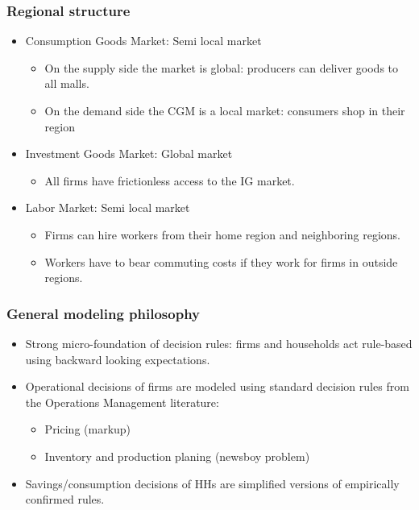 \documentclass{beamer}
\begin{document}
\frame
{
  \frametitle{Regional structure} 
\begin{itemize}
	\item Consumption Goods Market: Semi local market
	
\begin{itemize}
	\item On the supply side the market is global: producers can deliver goods
to all malls.
	\item On the demand side the CGM is a local market: consumers shop in their region
\end{itemize}

\item Investment Goods Market: Global market
\begin{itemize}
	\item  All firms have frictionless access to the IG market.
\end{itemize}
\item Labor Market: Semi local market
\begin{itemize}
	\item Firms can hire workers from their home region and neighboring regions.
	\item Workers have to bear commuting costs if they work for firms in outside regions. 
\end{itemize}


	
\end{itemize}
	

}






\frame
{
  \frametitle{General modeling philosophy} 
\begin{itemize}
\item Strong micro-foundation of decision rules:
 firms and households act rule-based using backward looking expectations. 

\item Operational decisions of firms are modeled using standard decision rules from the Operations Management literature: 
\begin{itemize}
	\item Pricing (markup)
\item Inventory and production planing (newsboy problem)
\end{itemize}

\item Savings/consumption decisions of HHs are simplified versions of empirically confirmed rules.

	
\end{itemize}


}
\end{document}
